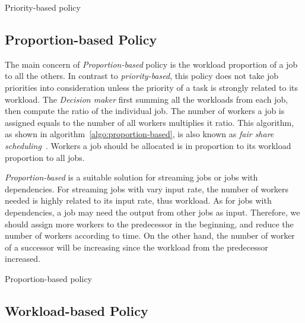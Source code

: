 \begin{algorithm}[htbp]
  
  \caption{Priority-based policy}
  \label{algo:priority-based}
\end{algorithm}

\subsection{Proportion-based Policy}	 %

The main concern of {\em Proportion-based} policy is the workload 
proportion of a job to all the others.
In contrast to {\em priority-based}, this policy does not take job 
priorities into consideration unless the priority of a task is strongly 
related to its workload.
The {\em Decision maker} first summing all the workloads from each job, 
then compute the ratio of the individual job.
The number of workers a job is assigned equals to the number of all 
workers multiplies it ratio.
This algorithm, as shown in algorithm~\ref{algo:proportion-based}, is
also known as {\em fair share scheduling}~\cite{cite:fair-share-scheduling}.
Workers a job should be allocated is in proportion to its workload 
proportion to all jobs. 

{\em Proportion-based} is a suitable solution for streaming jobs or jobs
with dependencies.  For streaming jobs with vary input rate, the number 
of workers needed is highly related to its input rate, thus workload.
As for jobs with dependencies, a job may need the output from other 
jobs as input.
Therefore, we should assign more workers to the predecessor in the 
beginning, and reduce the number of workers according to time.
On the other hand, the number of worker of a successor will be 
increasing since the workload from the predecessor increased.


\begin{algorithm}[htbp]
  
  \caption{Proportion-based policy}
  \label{algo:proportion-based}
\end{algorithm}


\subsection{Workload-based Policy}       %

